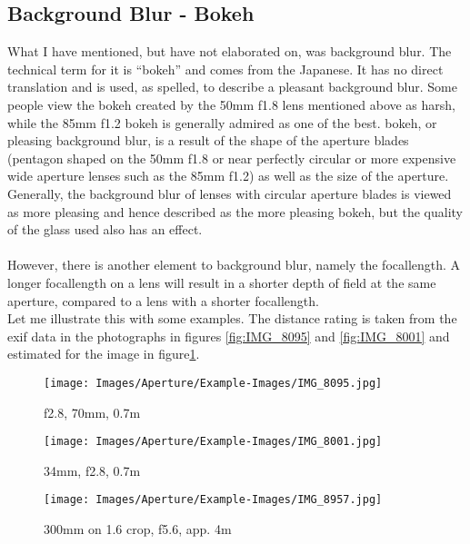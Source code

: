 \subsection{Background Blur - Bokeh}
\label{subsec:bokeh}

What I have mentioned, but have not elaborated on, was background blur. The technical term for it is ``\gls{bokeh}'' and comes from the Japanese. It has no direct translation and is used, as spelled, to describe a pleasant background blur. Some people view the \gls{bokeh} created by the 50mm f1.8 lens mentioned above as harsh, while the 85mm f1.2 bokeh is generally admired as one of the best. \Gls{bokeh}, or pleasing background blur, is a result of the shape of the aperture blades (pentagon shaped on the 50mm f1.8 or near perfectly circular or more expensive wide aperture lenses such as the 85mm f1.2) as well as the size of the \gls{aperture}.
\\
Generally, the background blur of lenses with circular aperture blades is viewed as more pleasing and hence described as the more pleasing \gls{bokeh}, but the quality of the glass used also has an effect.
\\
\\
However, there is another element to background blur, namely the \gls{focallength}. A longer \gls{focallength} on a lens will result in a shorter depth of field at the same \gls{aperture}, compared to a lens with a shorter \gls{focallength}.
\\
Let me illustrate this with some examples. The distance rating is taken from the exif data in the photographs in figures \ref{fig:IMG_8095} and \ref{fig:IMG_8001} and estimated for the image in figure\ref{fig:IMG_8957}.

\begin{figure}[htbp]
\begin{minipage}{.35\textwidth}
	\centering
		\texttt{[image: Images/Aperture/Example-Images/IMG\_8095.jpg]}
	\caption{f2.8, 70mm, 0.7m}
	\label{fig:IMG_8095}
\end{minipage}
\begin{minipage}{.28\textwidth}
\centering
		\texttt{[image: Images/Aperture/Example-Images/IMG\_8001.jpg]}
	\caption{34mm, f2.8, 0.7m}
	\label{fig:IMG_8001}
\end{minipage}
\begin{minipage}{.35\textwidth}
	\centering
		\texttt{[image: Images/Aperture/Example-Images/IMG\_8957.jpg]}
	\caption{300mm on 1.6 crop, f5.6, app. 4m}
	\label{fig:IMG_8957}
\end{minipage}
\end{figure}

